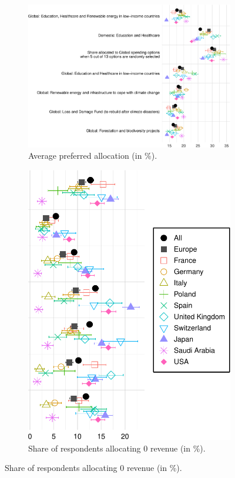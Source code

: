 \documentclass[12pt,english]{article}
\begin{document}
\begin{bibunit}
\begin{figure}
    \begin{subfigure}{.6\textwidth}
    \caption[]{Average preferred allocation (in \%).}
    \includegraphics[height=.34\textheight]{../figures/country_comparison/split_main_means_nolegend.pdf}
    \end{subfigure} 
  \begin{subfigure}{.4\textwidth}
    \caption[]{Share of respondents allocating 0 revenue (in \%).} 
    \includegraphics[height=.34\textheight]{../figures/country_comparison/split_main_nb0_nolabel.pdf}


\end{subfigure}
\end{figure}
\end{bibunit}
\end{document}
